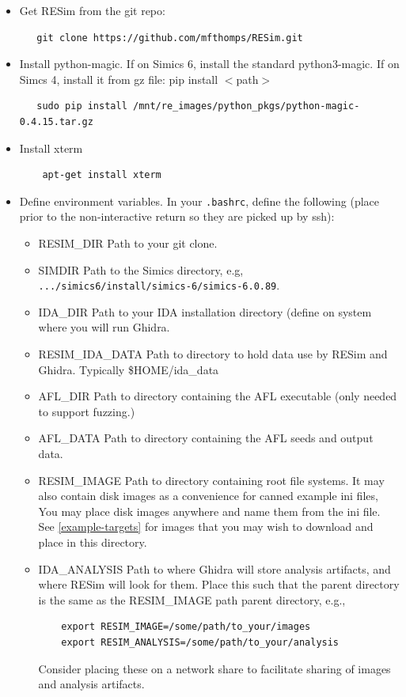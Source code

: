 \documentclass[titlepage]{article}
\begin{document}
\begin{itemize}
\item Get RESim from the git repo:
\begin{verbatim}
   git clone https://github.com/mfthomps/RESim.git
\end{verbatim}
\item Install python-magic.  If on Simics 6, install the standard python3-magic.  If on Simcs 4, install it from gz file:  pip install $<$path$>$
\begin{verbatim}
   sudo pip install /mnt/re_images/python_pkgs/python-magic-0.4.15.tar.gz
\end{verbatim}
\item Install xterm
\begin{verbatim}
    apt-get install xterm
\end{verbatim}

\item Define environment variables.  In your {\tt .bashrc}, define the following (place prior to the 
non-interactive return so they are picked up by ssh):
\begin{itemize}
\item RESIM\_DIR  Path to your git clone.
\item SIMDIR  Path to the Simics directory, e.g, {\tt .../simics6/install/simics-6/simics-6.0.89}.  
\item IDA\_DIR Path to your IDA installation directory (define on system where you will run Ghidra.
\item RESIM\_IDA\_DATA Path to directory to hold data use by RESim and Ghidra.  Typically \$HOME/ida\_data
\item AFL\_DIR Path to directory containing the AFL executable (only needed to support fuzzing.)
\item AFL\_DATA Path to directory containing the AFL seeds and output data.
\item RESIM\_IMAGE Path to directory containing root file systems.  It may also contain disk images as a convenience for canned example ini files,
You may place disk images anywhere and name them from the ini file.  See \ref{example-targets} for images that you may
wish to download and place in this directory.
\item IDA\_ANALYSIS Path to where Ghidra will store analysis artifacts, and where RESim will look for them.
Place this such that the parent directory is the same as the RESIM\_IMAGE path parent directory, e.g.,
\begin{verbatim}
    export RESIM_IMAGE=/some/path/to_your/images
    export RESIM_ANALYSIS=/some/path/to_your/analysis
\end{verbatim}
\noindent Consider placing these on a network share to facilitate sharing of images and analysis artifacts.


\end{itemize}
\end{itemize}
\end{document}
